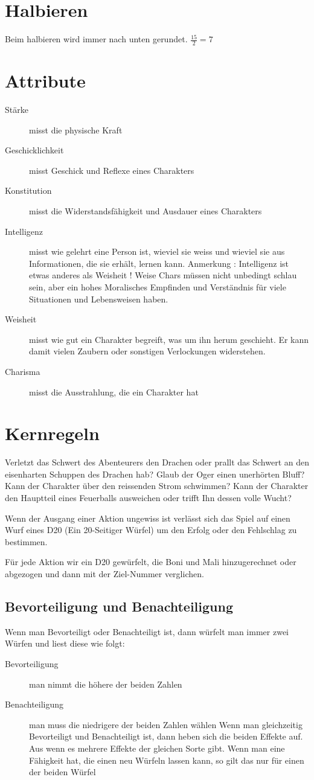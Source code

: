 \documentclass[paper=landscape,twocolumn=true,pagesize,DIV=14,fontsize=9pt]{scrartcl}
\begin{document}
\section{Halbieren}
Beim halbieren wird immer nach unten gerundet. \(\frac{15}{2}=7\)
\section{Attribute}
\begin{description}
\item[Stärke] misst die physische Kraft
\item[Geschicklichkeit] misst Geschick und Reflexe eines Charakters
\item[Konstitution] misst die Widerstandsfähigkeit und Ausdauer eines Charakters
\item[Intelligenz] misst wie gelehrt eine Person ist, wieviel sie weiss und wieviel sie aus Informationen, die sie erhält, lernen kann. Anmerkung : Intelligenz ist etwas anderes als Weisheit ! Weise Chars müssen nicht unbedingt schlau sein, aber ein hohes Moralisches Empfinden und Verständnis für viele Situationen und Lebensweisen haben. 
\item[Weisheit] misst wie gut ein Charakter begreift, was um ihn herum geschieht. Er kann damit vielen Zaubern oder sonstigen Verlockungen widerstehen.
\item[Charisma] misst die Ausstrahlung, die ein Charakter hat

\end{description}
\section{Kernregeln}
Verletzt das Schwert des Abenteurers den Drachen oder prallt das Schwert an den eisenharten Schuppen des Drachen hab? Glaub der Oger einen unerhörten Bluff? Kann der Charakter über den reissenden Strom schwimmen? Kann der Charakter den Hauptteil eines Feuerballs ausweichen oder trifft Ihn dessen volle Wucht?

Wenn der Ausgang einer Aktion ungewiss ist verlässt sich das Spiel auf einen Wurf eines D20 (Ein 20-Seitiger Würfel) um den Erfolg oder den Fehlschlag zu bestimmen. 

Für jede Aktion wir ein D20 gewürfelt, die Boni und Mali hinzugerechnet oder abgezogen und dann mit der Ziel-Nummer verglichen.
\subsection{Bevorteiligung und Benachteiligung}
Wenn man Bevorteiligt oder Benachteiligt ist, dann würfelt man immer zwei Würfen und liest diese wie folgt:
\begin{description}
\item[Bevorteiligung] man nimmt die höhere der beiden Zahlen
\item[Benachteiligung] man muss die niedrigere der beiden Zahlen wählen
Wenn man gleichzeitig Bevorteiligt und Benachteiligt ist, dann heben sich die beiden Effekte auf. Aus wenn es mehrere Effekte der gleichen Sorte gibt. 
Wenn man eine Fähigkeit hat, die einen neu Würfeln lassen kann, so gilt das nur für einen der beiden Würfel
\end{description}
\end{document}
